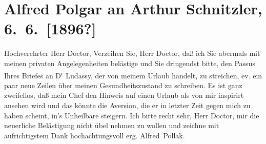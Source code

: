 

               \section[Alfred Polgar an Arthur Schnitzler, 6. 6. {[}1896?{]}]{ Alfred Polgar an Arthur Schnitzler, 6. 6. {[}1896?{]}}\nopagebreak{}\rehead{ }\begin{ledgroupsized}[t]{13cm}\normalsize\beginnumbering{} \toendnotes[C]{\smallbreak\pagebreak[2]} 
\toendnotes[C]{\smallbreak}\pstart{}{\pb}Hochverehrter Herr
                        Doctor,\pend\pstart
           Verzeihen Sie, Herr Doctor, daß ich Sie abermals mit meinen privaten
                    Angelegenheiten belästige und Sie dringendst bitte, den Passus Ihres Briefes an
                        D\textsuperscript{r}{ }Ludassy, der von meinem Urlaub handelt, zu
                    streichen, ev. ein paar neue Zeilen über meinen Gesundheitszustand zu
                    schreiben.\pend
           \pstart
           Es ist ganz zweifellos, daß mein Chef den Hinweis auf einen Urlaub als von mir
                    inspirirt ansehen wird und das könnte die Aversion, die er in letzter Zeit gegen
                    mich zu haben scheint, in’s Unheilbare steigern.\pend
           \pstart
           Ich bitte recht sehr, Herr Doctor, mir die neuerliche Belästigung nicht übel
                    nehmen zu wollen und zeichne mit aufrichtigstem Dank\pend
           \pstart hochachtungsvoll erg. \spacefill\mbox{Alfred Pollak.}\pend{}\pstart
           \label{K_L00550_1v}
\end{ledgroupsized}
